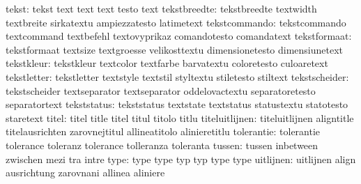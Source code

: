                     tekst: tekst                     text
                           text                      text
                           testo                     text
             tekstbreedte: tekstbreedte              textwidth
                           textbreite                sirkatextu
                           ampiezzatesto             latimetext
            tekstcommando: tekstcommando             textcommand
                           textbefehl                textovyprikaz
                           comandotesto              comandatext
             tekstformaat: tekstformaat              textsize
                           textgroesse               velikosttextu
                           dimensionetesto           dimensiunetext
               tekstkleur: tekstkleur                textcolor
                           textfarbe                 barvatextu
                           coloretesto               culoaretext
              tekstletter: tekstletter               textstyle
                           textstil                  styltextu
                           stiletesto                stiltext
            tekstscheider: tekstscheider             textseparator
                           textseparator             oddelovactextu
                           separatoretesto           separatortext
              tekststatus: tekststatus               textstate
                           textstatus                statustextu
                           statotesto                staretext
                    titel: titel                     title
                           titel                     titul
                           titolo                    titlu
           titeluitlijnen: titeluitlijnen            aligntitle
                           titelausrichten           zarovnejtitul
                           allineatitolo             alinieretitlu
               tolerantie: tolerantie                tolerance
                           toleranz                  tolerance
                           tolleranza                toleranta
                   tussen: tussen                    inbetween
                           zwischen                  mezi
                           tra                       intre
                     type: type                      type
                           typ                       typ
                           type                      type %
                uitlijnen: uitlijnen                 align
                           ausrichtung               zarovnani
                           allinea                   aliniere
